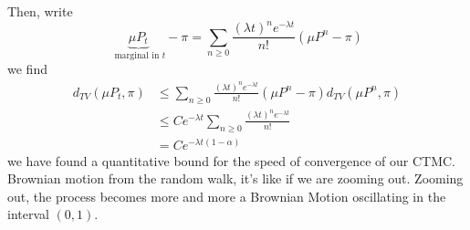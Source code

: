 \documentclass{article}
\begin{document}
Then, write
\begin{equation*}
	\underbrace{\mu P_t }_{\text{ marginal in $t$}}- \pi = \sum_{n \geq 0} \frac{(\lambda t)^n e^{-\lambda t}}{n!} (\mu P^n - \pi)
\end{equation*}
we find 
\begin{align*}
	d_{TV}(\mu P_t, \pi) &\leq \sum_{n \geq 0} \frac{(\lambda t)^n e^{-\lambda t}}{n!} (\mu P^n - \pi) d_{TV}(\mu P^n, \pi) \\
	& \leq C e^{-\lambda t} \sum_{n \geq 0} \frac{(\lambda t)^n e^{-\lambda t}}{n!} \\
	& = C e^{-\lambda t(1-\alpha)}
\end{align*}
we have found a quantitative bound for the speed of convergence of our CTMC. 
Brownian motion from the random walk, it's like if we are zooming out. Zooming out, the process becomes more and more a Brownian Motion oscillating in the interval $(0,1)$.
\end{document}
